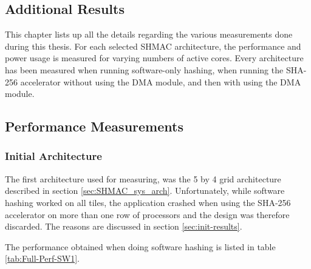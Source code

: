 \begin{appendix}
\chapter{Additional Results}
\label{app:performance}

This chapter lists up all the details regarding the various measurements done during this thesis.
For each selected SHMAC architecture, the performance and power usage is measured for varying numbers
of active cores. Every architecture has been measured when running software-only hashing, when running
the SHA-256 accelerator without using the DMA module, and then with using the DMA module. 

\section{Performance Measurements}

\subsection{Initial Architecture}

The first architecture used for measuring, was the 5 by 4 grid architecture described in section \ref{sec:SHMAC_sys_arch}.
Unfortunately, while software hashing worked on all tiles, the application crashed when using the SHA-256 accelerator on more than one row
of processors and the design was therefore discarded. The reasons are discussed in section \ref{sec:init-results}.

The performance obtained when doing software hashing is listed in table \ref{tab:Full-Perf-SW1}. 


\end{appendix}
